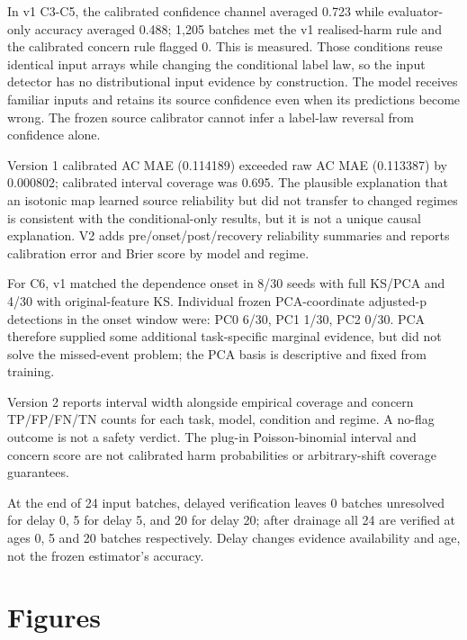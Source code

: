 \documentclass[11pt,a4paper]{article}
\begin{document}
In v1 C3-C5, the calibrated confidence channel averaged 0.723 while evaluator-only accuracy averaged 0.488; 1,205 batches met the v1 realised-harm rule and the calibrated concern rule flagged 0. This is measured. Those conditions reuse identical input arrays while changing the conditional label law, so the input detector has no distributional input evidence by construction. The model receives familiar inputs and retains its source confidence even when its predictions become wrong. The frozen source calibrator cannot infer a label-law reversal from confidence alone.\par

Version 1 calibrated AC MAE (0.114189) exceeded raw AC MAE (0.113387) by 0.000802; calibrated interval coverage was 0.695. The plausible explanation that an isotonic map learned source reliability but did not transfer to changed regimes is consistent with the conditional-only results, but it is not a unique causal explanation. V2 adds pre/onset/post/recovery reliability summaries and reports calibration error and Brier score by model and regime.\par

For C6, v1 matched the dependence onset in 8/30 seeds with full KS/PCA and 4/30 with original-feature KS. Individual frozen PCA-coordinate adjusted-p detections in the onset window were: PC0 6/30, PC1 1/30, PC2 0/30. PCA therefore supplied some additional task-specific marginal evidence, but did not solve the missed-event problem; the PCA basis is descriptive and fixed from training.\par

Version 2 reports interval width alongside empirical coverage and concern TP/FP/FN/TN counts for each task, model, condition and regime. A no-flag outcome is not a safety verdict. The plug-in Poisson-binomial interval and concern score are not calibrated harm probabilities or arbitrary-shift coverage guarantees.\par

At the end of 24 input batches, delayed verification leaves 0 batches unresolved for delay 0, 5 for delay 5, and 20 for delay 20; after drainage all 24 are verified at ages 0, 5 and 20 batches respectively. Delay changes evidence availability and age, not the frozen estimator's accuracy.\par

\section{Figures}
\end{document}
